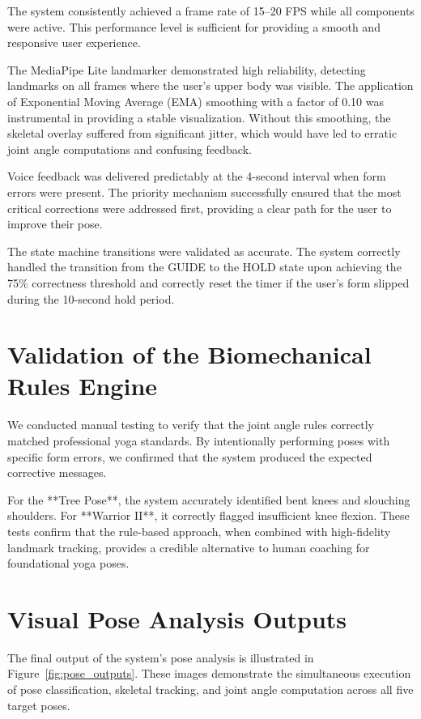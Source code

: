 The system consistently achieved a frame rate of 15--20 FPS while all components were active. This performance level is sufficient for providing a smooth and responsive user experience. 

The MediaPipe Lite landmarker demonstrated high reliability, detecting landmarks on all frames where the user's upper body was visible. The application of Exponential Moving Average (EMA) smoothing with a factor of 0.10 was instrumental in providing a stable visualization. Without this smoothing, the skeletal overlay suffered from significant jitter, which would have led to erratic joint angle computations and confusing feedback.

Voice feedback was delivered predictably at the 4-second interval when form errors were present. The priority mechanism successfully ensured that the most critical corrections were addressed first, providing a clear path for the user to improve their pose.

The state machine transitions were validated as accurate. The system correctly handled the transition from the GUIDE to the HOLD state upon achieving the 75\% correctness threshold and correctly reset the timer if the user's form slipped during the 10-second hold period.

\section{Validation of the Biomechanical Rules Engine}
We conducted manual testing to verify that the joint angle rules correctly matched professional yoga standards. By intentionally performing poses with specific form errors, we confirmed that the system produced the expected corrective messages.

For the **Tree Pose**, the system accurately identified bent knees and slouching shoulders. For **Warrior II**, it correctly flagged insufficient knee flexion. These tests confirm that the rule-based approach, when combined with high-fidelity landmark tracking, provides a credible alternative to human coaching for foundational yoga poses.

\section{Visual Pose Analysis Outputs}
The final output of the system's pose analysis is illustrated in Figure~\ref{fig:pose_outputs}. These images demonstrate the simultaneous execution of pose classification, skeletal tracking, and joint angle computation across all five target poses.

